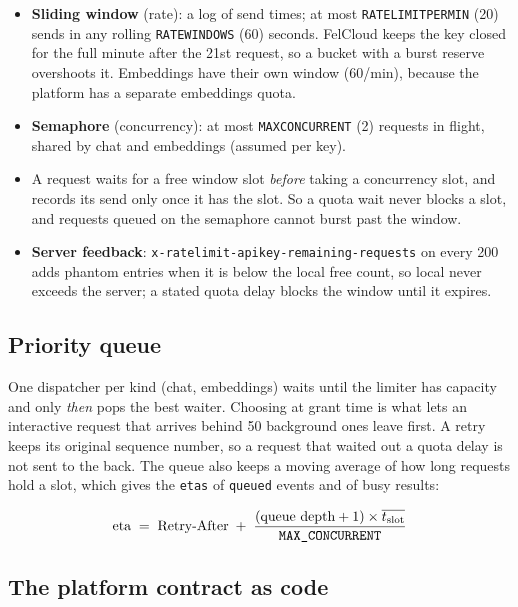 \documentclass[11pt,a4paper]{article}
\renewcommand{\_}{\origus\allowbreak}
\begin{document}
\begin{itemize}
  \item \textbf{Sliding window} (rate): a log of send times; at most \texttt{RATE\_LIMIT\_PER\_MIN} (20) sends in
  any rolling \texttt{RATE\_WINDOW\_S} (60) seconds. FelCloud keeps the key closed for the full minute after the
  21st request, so a bucket with a burst reserve overshoots it. Embeddings have their own window (60/min),
  because the platform has a separate embeddings quota.
  \item \textbf{Semaphore} (concurrency): at most \texttt{MAX\_CONCURRENT} (2) requests in flight, shared by
  chat and embeddings (assumed per key).
  \item A request waits for a free window slot \emph{before} taking a concurrency slot, and records its send only once
  it has the slot. So a quota wait never blocks a slot, and requests queued on the semaphore cannot
  burst past the window.
  \item \textbf{Server feedback}: \texttt{x-ratelimit-api\_key-remaining-requests} on every 200 adds phantom
  entries when it is below the local free count, so local never exceeds the server; a stated quota delay blocks the window until it expires.
\end{itemize}

\subsection{Priority queue}

One dispatcher per kind (chat, embeddings) waits until the limiter has capacity and only
\emph{then} pops the best waiter. Choosing at grant time is what lets an interactive request that
arrives behind 50 background ones leave first. A retry keeps its original sequence number, so a
request that waited out a quota delay is not sent to the back. The queue also keeps a moving average
of how long requests hold a slot, which gives the \texttt{eta\_s} of \texttt{queued} events and of busy results:

\[
  \text{eta} \;=\; \text{Retry-After} \;+\; \frac{(\text{queue depth} + 1)\times \overline{t_{\text{slot}}}}{\texttt{MAX\_CONCURRENT}}
\]

\subsection{The platform contract as code}
\label{sec:retry}
\end{document}
